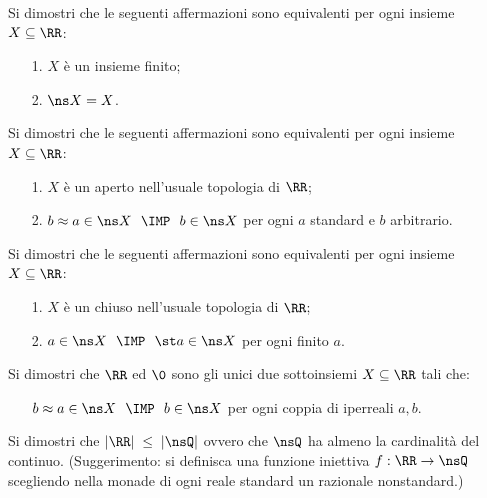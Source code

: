 \begin{exercise}
Si dimostri che le seguenti affermazioni sono equivalenti per ogni insieme $X\subseteq\RR$:\nobreak
\begin{itemize}
\item[1.]  $X$ \`e un insieme finito;
\item[2.]  $\ns X=X$.\QED
\end{itemize}
\end{exercise}

\begin{exercise}
Si dimostri che le seguenti affermazioni sono equivalenti per ogni insieme $X\subseteq\RR$:\nobreak
\begin{itemize}
\item[1.]  $X$ \`e un aperto nell'usuale topologia di $\RR$;
\item[2.]  $b\approx a\in\ns X \ \ \IMP\ \ b\in\ns X$ per ogni $a$ standard e $b$ arbitrario.\QED
\end{itemize}
\end{exercise}

\begin{exercise}
Si dimostri che le seguenti affermazioni sono equivalenti per ogni insieme $X\subseteq\RR$:\nobreak
\begin{itemize}
\item[1.]  $X$ \`e un chiuso nell'usuale topologia di $\RR$;
\item[2.]  $a\in\ns X \ \ \IMP\ \ \st a\in\ns X$ per ogni finito $a$.\QED
\end{itemize}
\end{exercise}

\begin{exercise}
Si dimostri che $\RR$ ed $\0$ sono gli unici due sottoinsiemi $X\subseteq\RR$ tali che:
\begin{itemize}
\item[]  $b\approx a\in\ns X \ \ \IMP\ \ b\in\ns X$ per ogni coppia di iperreali $a, b$.\QED
\end{itemize}
\end{exercise}

\begin{exercise}
Si dimostri che $|\RR|\;\le\;|\nsQ|$ ovvero che $\nsQ$ ha almeno la cardinalit\`a del continuo. (Suggerimento: si definisca una funzione iniettiva $f:\RR\to\nsQ$ scegliendo nella monade di ogni reale standard un razionale nonstandard.)\QED
\end{exercise}

